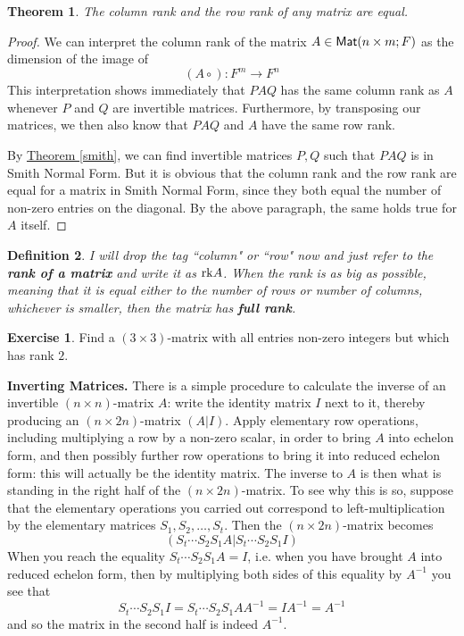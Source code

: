 \documentclass[11pt]{amsbook}
\newtheorem{theorem}{Theorem}[section]
\newtheorem{definition}[theorem]{Definition}
\theoremstyle{definition}
\newtheorem{exercise}{Exercise}
\begin{document}
\begin{theorem}
The column rank and the row rank of any matrix are equal.
\end{theorem}

\begin{proof}
We can interpret the column rank of the matrix $A\in {\sf Mat}(n\times m; F)$ as the dimension of the image of $$(A\circ): F^m\to F^n$$ This interpretation shows immediately that $PAQ$ has the same column rank as $A$ whenever $P$ and $Q$ are invertible matrices. Furthermore, by transposing our matrices, we then also know that $PAQ$ and $A$ have the same row rank.

By \hyperref[smith]{Theorem \ref{smith}}, we can find invertible matrices $P,Q$ such that $PAQ$ is in Smith Normal Form. But it is obvious that the column rank and the row rank are equal for a matrix in Smith Normal Form, since they both equal the number of non-zero entries on the diagonal. By the above paragraph, the same holds true for $A$ itself.
\end{proof}

\begin{definition} \label{fullrank}
I will drop the tag ``column" or ``row" now and just refer to  the {\bf rank of a matrix} and write it as ${\rm rk} A$. When the rank is as big as possible, meaning that it is equal either to the number of rows or number of columns, whichever is smaller, then the matrix has {\bf full rank}.
\end{definition}

\begin{exercise}
Find a $(3\times 3)$-matrix with all entries non-zero integers but which has rank $2$.
\end{exercise}
\medskip

\noindent
{\bf Inverting Matrices.} There is a simple procedure to calculate the inverse of an invertible $(n\times n)$-matrix $A$: write the identity matrix $I$ next to it, thereby producing an $(n\times 2n)$-matrix $(A|I)$. Apply elementary row operations, including multiplying a row by a non-zero scalar, in order to bring $A$ into echelon form, and then possibly further row operations to bring it into reduced echelon form: this will actually be the identity matrix. The inverse to $A$ is then what is standing in the right half of the $(n\times 2n)$-matrix. To see why this is so, suppose that the elementary operations you carried out correspond to left-multiplication by the elementary matrices $S_1, S_2, \ldots , S_t$. Then the $(n\times 2n)$-matrix becomes $$(S_t\cdots S_2S_1A | S_t\cdots S_2S_1I)$$
When you reach the equality $S_t\cdots S_2S_1A = I$, i.e. when you have brought $A$ into reduced echelon form, then by multiplying both sides of this equality by $A^{-1}$ you see that $$S_t\cdots S_2 S_1 I = S_t\cdots S_2 S_1A A^{-1} = IA^{-1} = A^{-1}$$ and so the matrix in the second half is indeed $A^{-1}$.
\end{document}
